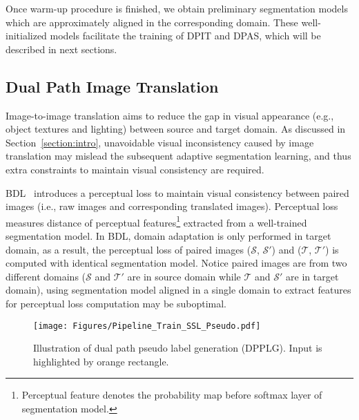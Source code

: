 \documentclass[10pt,twocolumn,letterpaper]{article}
\begin{document}
Once warm-up procedure is finished, we obtain preliminary segmentation models which are approximately aligned in the corresponding domain. These well-initialized models facilitate the training of DPIT and DPAS, which will be described in next sections.

\subsection{Dual Path Image Translation\label{section:DPIT}}
  Image-to-image translation aims to reduce the gap in visual appearance (e.g., object textures and lighting) between source and target domain. As discussed in Section~\ref{section:intro}, unavoidable visual inconsistency caused by image translation may mislead the subsequent adaptive segmentation learning, and thus extra constraints to maintain visual consistency are required. 
  
  BDL~\cite{li2019bidirectional} introduces a perceptual loss to maintain visual consistency between paired images (i.e., raw images and corresponding translated images). Perceptual loss measures distance of perceptual features\footnote{Perceptual feature denotes the probability map before softmax layer of segmentation model.} extracted from a well-trained segmentation model. In BDL, domain adaptation is only performed in target domain, as a result, the perceptual loss of paired images ($\mathcal{S}$, $\mathcal{S}'$) and ($\mathcal{T}$, $\mathcal{T}'$) is computed with identical segmentation model. Notice paired images are from two different domains ($\mathcal{S}$ and $\mathcal{T}'$ are in source domain while $\mathcal{T}$ and $\mathcal{S}'$ are in target domain), using segmentation model aligned in a single domain to extract features for perceptual loss computation may be suboptimal. 
  
 \begin{figure}[t]
  \centering
  \texttt{[image: Figures/Pipeline\_Train\_SSL\_Pseudo.pdf]}
\caption{Illustration of dual path pseudo label generation (DPPLG). Input is highlighted by orange rectangle.}
  \label{fig:DPPLG}
  \vspace{-4mm}
\end{figure}
\end{document}
